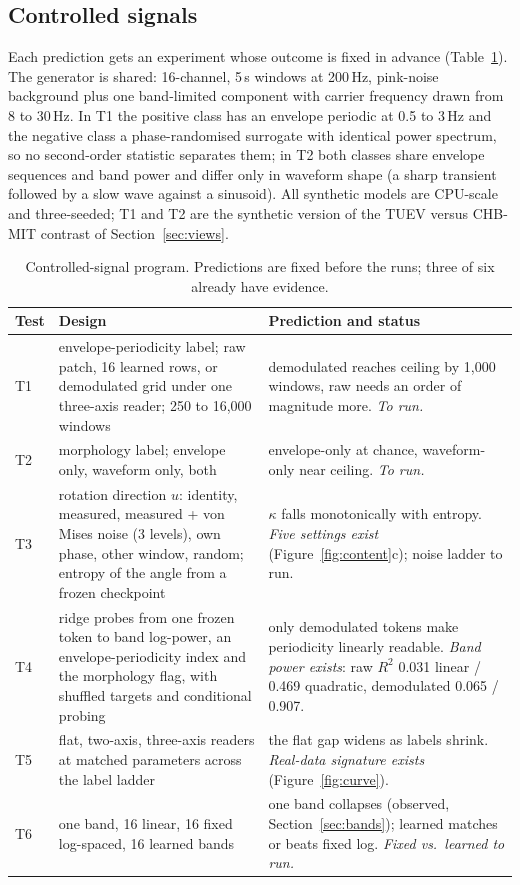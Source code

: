\subsection{Controlled signals}
\label{sec:toy}
Each prediction gets an experiment whose outcome is fixed in advance (Table~\ref{tab:toy}). The generator is shared: 16-channel, 5\,s windows at 200\,Hz, pink-noise background plus one band-limited component with carrier frequency drawn from 8 to 30\,Hz. In T1 the positive class has an envelope periodic at 0.5 to 3\,Hz and the negative class a phase-randomised surrogate with identical power spectrum, so no second-order statistic separates them; in T2 both classes share envelope sequences and band power and differ only in waveform shape (a sharp transient followed by a slow wave against a sinusoid). All synthetic models are CPU-scale and three-seeded; T1 and T2 are the synthetic version of the TUEV versus CHB-MIT contrast of Section~\ref{sec:views}.

\begin{table}[t]
\centering
\TableStyle
\setlength{\tabcolsep}{3pt}
\caption{Controlled-signal program. Predictions are fixed before the runs; three of six already have evidence.}
\label{tab:toy}
\begin{tabular}{@{}p{0.5cm}>{\raggedright\arraybackslash}p{3.85cm}>{\raggedright\arraybackslash}p{3.5cm}@{}}
\toprule
Test & Design & Prediction and status \\
\midrule
T1 & envelope-periodicity label; raw patch, 16 learned rows, or demodulated grid under one three-axis reader; 250 to 16,000 windows & demodulated reaches ceiling by 1,000 windows, raw needs an order of magnitude more. \emph{To run.} \\
T2 & morphology label; envelope only, waveform only, both & envelope-only at chance, waveform-only near ceiling. \emph{To run.} \\
T3 & rotation direction $u$: identity, measured, measured + von Mises noise (3 levels), own phase, other window, random; entropy of the angle from a frozen checkpoint & $\kappa$ falls monotonically with entropy. \emph{Five settings exist} (Figure~\ref{fig:content}c); noise ladder to run. \\
T4 & ridge probes from one frozen token to band log-power, an envelope-periodicity index and the morphology flag, with shuffled targets and conditional probing~\cite{hewitt2021conditional,hewitt2019control} & only demodulated tokens make periodicity linearly readable. \emph{Band power exists}: raw $R^2$ 0.031 linear / 0.469 quadratic, demodulated 0.065 / 0.907. \\
T5 & flat, two-axis, three-axis readers at matched parameters across the label ladder & the flat gap widens as labels shrink. \emph{Real-data signature exists} (Figure~\ref{fig:curve}). \\
T6 & one band, 16 linear, 16 fixed log-spaced, 16 learned bands & one band collapses (observed, Section~\ref{sec:bands}); learned matches or beats fixed log. \emph{Fixed vs.\ learned to run.} \\
\bottomrule
\end{tabular}
\end{table}

